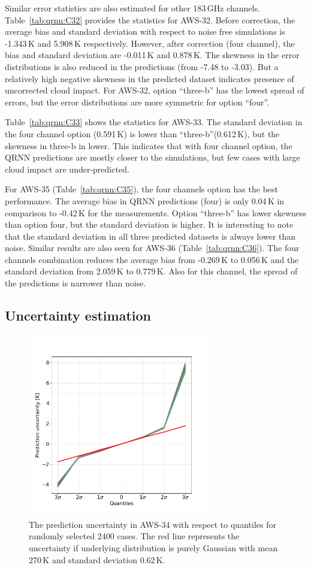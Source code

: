 \documentclass[12pt]{article}
\begin{document}
Similar error statistics are also estimated for other 183\,GHz channels.
Table~\ref{tab:qrnn:C32} provides the statistics for AWS-32. Before correction,
the average bias and standard deviation with respect to noise free simulations
is -1.343\,K and 5.908\,K respectively. However, after correction (four
channel), the bias and standard deviation are -0.011\,K and 0.878\,K. The
skewness in the error distributions is also reduced in the predictions (from
-7.48 to -3.03). But a relatively high negative skewness in the predicted
dataset indicates presence of uncorrected cloud impact. For AWS-32, option
``three-b'' has the lowest spread of errors, but the error distributions are
more symmetric for option ``four''.

Table~\ref{tab:qrnn:C33} shows the statistics for AWS-33. The standard
deviation in the four channel option (0.591\,K) is lower than
``three-b''(0.612\,K), but the skewness in three-b in lower. This indicates
that with four channel option, the QRNN predictions are mostly closer to the
simulations, but few cases with large cloud impact are under-predicted.

For AWS-35 (Table~\ref{tab:qrnn:C35}), the four channels option has the best performance. The average bias in QRNN predictions (four) is only 0.04\,K in comparison to -0.42\,K for the measurements. Option ``three-b'' has lower skewness than option four, but the standard deviation is higher. It is interesting to note that the standard deviation in all three predicted datasets is always lower than noise. Similar results are also seen for AWS-36 (Table~\ref{tab:qrnn:C36}). The four channels combination reduces the average bias from -0.269\,K to 0.056\,K and the standard deviation from 2.059\,K to 0.779\,K. Also for this channel, the spread of the predictions is narrower than noise.  

\subsection{Uncertainty estimation}
%
\begin{figure}[!tb]
	\centering
	\includegraphics[height=80mm]{prediction_uncertainty.png}
	\caption{The prediction uncertainty in AWS-34 with respect to quantiles for randomly selected 2400 cases. The red line represents the uncertainty if underlying distribution is purely Gaussian with mean 270\,K and standard deviation 0.62\,K. }
	\label{fig:prediction_uncertainty}
\end{figure}
\end{document}
